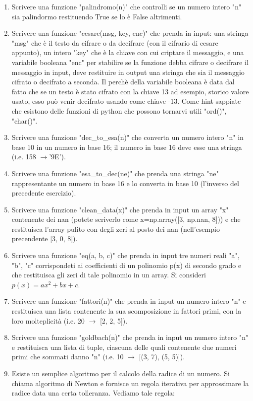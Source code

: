\documentclass[10pt,a4paper]{article}
\begin{document}
\begin{enumerate}
\item Scrivere una funzione "palindromo(n)" che controlli se un numero intero "n" sia palindormo restituendo True se lo è False altrimenti.
\item Scrivere una funzione "cesare(msg, key, enc)" che prenda in input: una stringa "msg" che è il testo da cifrare o da decifrare (con il cifrario di cesare appunto), un intero "key" che è la chiave con cui criptare il messaggio, e una variabile booleana "enc" per stabilire se la funzione debba cifrare o decifrare il messaggio in input, deve restituire in output una stringa che sia il messaggio cifrato o decifrato a seconda. Il perchè della variabile booleana è data dal fatto che se un testo è stato cifrato con la chiave 13 ad esempio, storico valore usato, esso può venir decifrato usando come chiave -13. Come hint sappiate che esistono delle funzioni di python che possono tornarvi utili "ord()", "char()".
\item Scrivere una funzione "dec\_to\_esa(n)" che converta un numero intero "n" in base 10 in un numero in base 16; il numero in base 16 deve esse una stringa (i.e. 158 $\rightarrow$'9E').
\item Scrivere una funzione "esa\_to\_dec(ne)" che prenda una stringa "ne" rappresentante un numero in base 16 e lo converta in base 10 (l'inverso del precedente esercizio).
\item Scrivere una funzione "clean\_data(x)" che prenda in input un array "x" contenente dei nan (potete scriverlo come x=np.array([3, np.nan, 8])) e che restituisca l'array pulito con degli zeri al posto dei nan (nell'esempio precendente [3, 0, 8]).
\item Scrivere una funzione "eq(a, b, c)" che prenda in input tre numeri reali "a", "b", "c" corrispondeti ai coefficienti di un polinomio p(x) di secondo grado e che restituisca gli zeri di tale polinomio in un array. Si consideri $p(x)=ax^2+bx+c$.
\item Scrivere una funzione "fattori(n)" che prenda in input un numero intero "n" e restituisca una lista contenente la sua scomposizione in fattori primi, con la loro molteplicità (i.e. 20 $\rightarrow$ [2, 2, 5]). 
\item Scrivere una funzione "goldbach(n)" che prenda in input un numero intero "n" e restituisca una lista di tuple, ciascuna delle quali contenente due numeri primi che sommati danno "n" (i.e. 10 $\rightarrow$ [(3, 7), (5, 5)]).
\item Esiste un semplice algoritmo per il calcolo della radice di un numero. Si chiama algoritmo di Newton e fornisce un regola iterativa per approssimare la radice data una certa tolleranza. Vediamo tale regola:

\end{enumerate}
\end{document}
